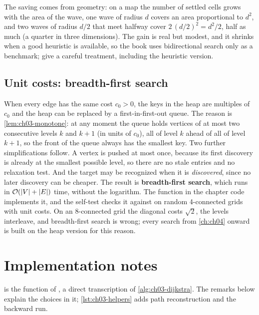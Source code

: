 The saving comes from geometry: on a map the number of settled cells grows with the area of the
wave, one wave of radius $d$ covers an area proportional to $d^2$, and two waves of radius $d/2$
that meet halfway cover $2\,(d/2)^2=d^2/2$, half as much (a quarter in three dimensions). The
gain is real but modest, and it shrinks when a good heuristic is available, so the book uses
bidirectional search only as a benchmark; \textcite{russell2020aima} give a careful treatment,
including the heuristic version.

\subsection{Unit costs: breadth-first search}
\label{sec:ch03-bfs}
%
When every edge has the same cost $c_0>0$, the keys in the heap are multiples of $c_0$ and the
heap can be replaced by a first-in-first-out queue. The reason is \cref{lem:ch03-monotone}: at
any moment the queue holds vertices of at most two consecutive levels $k$ and $k+1$ (in units
of $c_0$), all of level $k$ ahead of all of level $k+1$, so the front of the queue always has
the smallest key. Two further simplifications follow. A vertex is pushed at most once, because
its first discovery is already at the smallest possible level, so there are no stale entries
and no relaxation test. And the target may be recognized when it is \emph{discovered}, since no
later discovery can be cheaper. The result is \textbf{breadth-first search}, which runs in
$\mathcal{O}\!\left(\left\lvert V \right\rvert+\left\lvert E \right\rvert\right)$ time, without the logarithm. The function  in the chapter
code implements it, and the self-test checks it against  on random 4-connected
grids with unit costs. On an 8-connected grid the diagonal costs
$\sqrt2$, the levels interleave, and breadth-first search is wrong; every search from
\cref{ch:ch04} onward is built on the heap version for this reason.

\section{Implementation notes}
\label{sec:ch03-implementation}

 is the function  of , a direct
transcription of \cref{alg:ch03-dijkstra}. The remarks below explain the choices in it;
\cref{lst:ch03-helpers} adds path reconstruction and the backward run.

